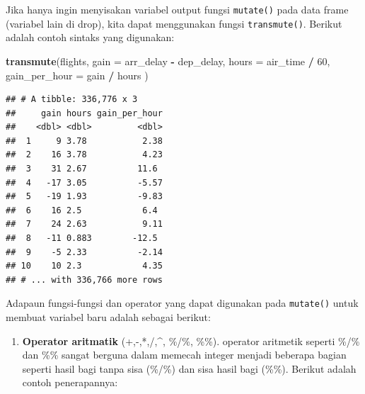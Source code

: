 \documentclass[]{book}
\newenvironment{Shaded}{\begin{snugshade}}{\end{snugshade}}
\newcommand{\KeywordTok}[1]{\textcolor[rgb]{0.13,0.29,0.53}{\textbf{#1}}}
\newcommand{\DataTypeTok}[1]{\textcolor[rgb]{0.13,0.29,0.53}{#1}}
\newcommand{\DecValTok}[1]{\textcolor[rgb]{0.00,0.00,0.81}{#1}}
\newcommand{\StringTok}[1]{\textcolor[rgb]{0.31,0.60,0.02}{#1}}
\newcommand{\OperatorTok}[1]{\textcolor[rgb]{0.81,0.36,0.00}{\textbf{#1}}}
\newcommand{\NormalTok}[1]{#1}
\providecommand{\tightlist}{%
  \setlength{\itemsep}{0pt}\setlength{\parskip}{0pt}}
\begin{document}
Jika hanya ingin menyisakan variabel output fungsi \texttt{mutate()}
pada data frame (variabel lain di drop), kita dapat menggunakan fungsi
\texttt{transmute()}. Berikut adalah contoh sintaks yang digunakan:

\begin{Shaded}
\begin{Highlighting}[]
\KeywordTok{transmute}\NormalTok{(flights,}
  \DataTypeTok{gain =}\NormalTok{ arr_delay }\OperatorTok{-}\StringTok{ }\NormalTok{dep_delay,}
  \DataTypeTok{hours =}\NormalTok{ air_time }\OperatorTok{/}\StringTok{ }\DecValTok{60}\NormalTok{,}
  \DataTypeTok{gain_per_hour =}\NormalTok{ gain }\OperatorTok{/}\StringTok{ }\NormalTok{hours}
\NormalTok{)}
\end{Highlighting}
\end{Shaded}

\begin{verbatim}
## # A tibble: 336,776 x 3
##     gain hours gain_per_hour
##    <dbl> <dbl>         <dbl>
##  1     9 3.78           2.38
##  2    16 3.78           4.23
##  3    31 2.67          11.6 
##  4   -17 3.05          -5.57
##  5   -19 1.93          -9.83
##  6    16 2.5            6.4 
##  7    24 2.63           9.11
##  8   -11 0.883        -12.5 
##  9    -5 2.33          -2.14
## 10    10 2.3            4.35
## # ... with 336,766 more rows
\end{verbatim}

Adapaun fungsi-fungsi dan operator yang dapat digunakan pada
\texttt{mutate()} untuk membuat variabel baru adalah sebagai berikut:

\begin{enumerate}
\def\labelenumi{\arabic{enumi}.}
\tightlist
\item
  \textbf{Operator aritmatik} (+,-,*,/,\^{}, \%/\%, \%\%). operator
  aritmetik seperti \%/\% dan \%\% sangat berguna dalam memecah integer
  menjadi beberapa bagian seperti hasil bagi tanpa sisa (\%/\%) dan sisa
  hasil bagi (\%\%). Berikut adalah contoh penerapannya:
\end{enumerate}

\begin{Shaded}
\end{Shaded}
\end{document}
